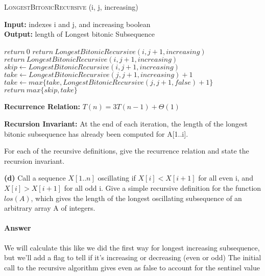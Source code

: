 \documentclass{article}
\begin{document}
\begin{algorithm} \caption{\textsc{LongestBitonicRecursive} (i, j, increasing)}\label{alg:seb}
    {\bf Input:} indexes i and j, and increasing boolean\\
    {\bf Output:} length of Longest bitonic Subsequence
    \begin{algorithmic}[1]
            \State$return\ 0$
                \State$return\ LongestBitonicRecursive(i, j+1, increasing)$
            \EndIf{}
        \Else{}
                \State$return\ LongestBitonicRecursive(i, j+1, increasing)$
            \EndIf{}
        \EndIf{}
        \State$skip \gets LongestBitonicRecursive(i, j+1, increasing)$
        \State$take \gets LongestBitonicRecursive(j, j+1, increasing) +1$
            \State$take \gets max\{take, LongestBitonicRecursive(j, j+1, false) +1\}$
        \EndIf{}
        \State$return\ max\{skip, take\}$
    \end{algorithmic}
\end{algorithm}

{\bf Recurrence Relation: } $T(n) = 3T(n-1) + \Theta(1)$

{\bf Recursion Invariant:} At the end of each iteration, the length of the longest bitonic subsequence has already been computed for A[1..i].



For each of the recursive definitions, give the recurrence
relation and state the recursion invariant.

{\bf (d)} Call a sequence $X[1.. n]$ oscillating if $X[i] < X[i + 1]$ for all even i, and
$X[i] > X[i + 1]$ for all odd i. Give a simple recursive definition for
the function $los(A)$, which gives the length of the longest oscillating
subsequence of an arbitrary array A of integers.

\paragraph{Answer}

We will calculate this like we did the first way for longest increasing subsequence, but we'll add a
flag to tell if it's increasing or decreasing (even or odd)
The initial call to the recursive algorithm gives even as false to account for the sentinel value
\end{document}
